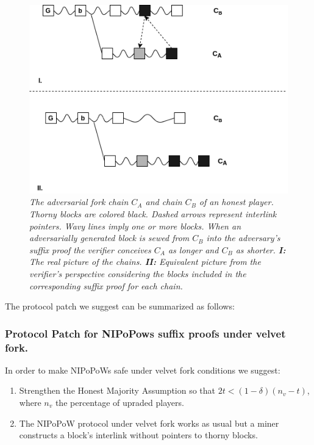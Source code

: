 \begin{figure}[h!]
	\begin{center}
		\includegraphics[scale=0.5]{figures/injection.png}
	\end{center}
	\caption{\textit{The adversarial fork chain $C_A$ and chain $C_B$ of an honest
	player. Thorny blocks are colored black. Dashed arrows represent interlink
	pointers. Wavy lines imply one or more blocks. When an adversarially generated
	block is sewed from $C_B$ into the adversary's suffix proof the verifier
	conceives $C_A$ as longer and $C_B$ as shorter.  \textbf{I:} The real picture
	of the chains. \textbf{II:} Equivalent picture from the verifier's perspective
	considering the blocks included in the corresponding suffix proof for each chain.}}
	\label{fig:injection}
\end{figure}


The protocol patch we suggest can be summarized as follows:\\


\subsubsection*{Protocol Patch for NIPoPows suffix proofs under velvet fork.} In order
to make NIPoPoWs safe under velvet fork conditions we suggest:
\begin{enumerate}
\item Strengthen the Honest Majority Assumption so that $2t < (1 - \delta)(n_v-t)$,
where $n_v$ the percentage of upraded players.
\item The NIPoPoW protocol under velvet fork works as usual but a miner constructs
a block's interlink without pointers to thorny blocks.
\end{enumerate}

